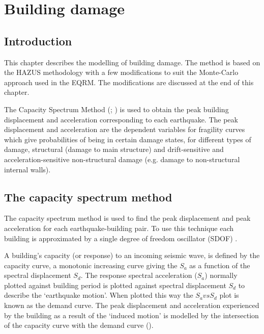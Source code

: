 \chapter{Building damage}
\label{ch:damage}

\section{Introduction}
\label{sec:v-dam-intro}

This chapter describes the modelling of building damage. The
method is based on the HAZUS methodology \citep{dr_FEMA99b} with a
few modifications to suit the Monte-Carlo approach used in the
EQRM. The modifications are discussed at the end of this chapter.

The Capacity Spectrum Method
(\citealp{dr_FEMA99b}; \citealp{dr_Kircher97a}) is used to obtain
the peak building displacement and acceleration corresponding to
each earthquake. The peak displacement
and acceleration are the dependent variables for fragility
curves \citep{dr_Kircher97a} which give
probabilities of being in certain damage states, for different
types of damage, structural (damage to main structure) and
drift-sensitive and acceleration-sensitive non-structural damage
(e.g. damage to non-structural internal walls).


\section{The capacity spectrum method}
\label{sec:v-dam-capspect}

The capacity spectrum method is
used to find the peak displacement and
peak acceleration for each
earthquake-building pair. To use this technique each building is
approximated by a single degree of freedom oscillator (SDOF)
\citep{dr_Chopra01c}.

A building's capacity (or response) to an incoming seismic wave,
is defined by the capacity curve, a
monotonic increasing curve giving the $S_a$ as a function of the
spectral displacement $S_d$.
The response spectral acceleration ($S_a$) normally plotted against building period is
plotted against spectral displacement $S_d$ to describe the `earthquake motion'. When
plotted this way the $S_a vs S_d$ plot is known as the demand
curve. The peak displacement and acceleration experienced by the building as a
result of the `induced motion' is modelled by the intersection of
the capacity curve with the demand
curve ().

